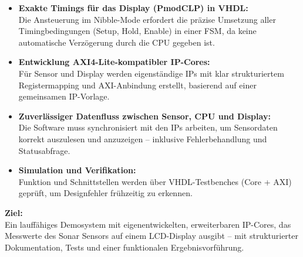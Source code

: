\begin{itemize}
  \item \textbf{Exakte Timings für das Display (PmodCLP) in VHDL:}\\
  Die Ansteuerung im Nibble-Mode erfordert die präzise Umsetzung aller Timingbedingungen (Setup, Hold, Enable) in einer FSM, da keine automatische Verzögerung durch die CPU gegeben ist.
\item \textbf{Entwicklung AXI4-Lite-kompatibler IP-Cores:}\\
  Für Sensor und Display werden eigenständige IPs mit klar strukturiertem Registermapping und AXI-Anbindung erstellt, basierend auf einer gemeinsamen IP-Vorlage.
\item \textbf{Zuverlässiger Datenfluss zwischen Sensor, CPU und Display:}\\
  Die Software muss synchronisiert mit den IPs arbeiten, um Sensordaten korrekt auszulesen und anzuzeigen – inklusive Fehlerbehandlung und Statusabfrage.
\item \textbf{Simulation und Verifikation:}\\
  Funktion und Schnittstellen werden über VHDL-Testbenches (Core + AXI) geprüft, um Designfehler frühzeitig zu erkennen.
\end{itemize}
\textbf{Ziel:}\\
Ein lauffähiges Demosystem mit eigenentwickelten, erweiterbaren IP-Cores, das Messwerte des Sonar Sensors auf einem LCD-Display ausgibt – mit strukturierter Dokumentation, Tests und einer funktionalen Ergebnisvorführung.